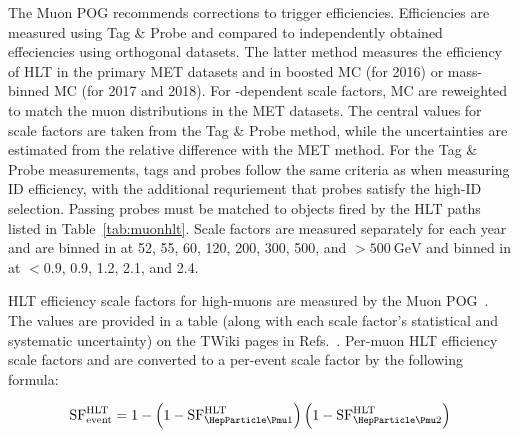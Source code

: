 The Muon POG recommends corrections to trigger efficiencies. Efficiencies are measured using Tag \& Probe and compared to independently obtained effeciencies using orthogonal datasets. The latter method measures the efficiency of HLT in the primary MET datasets and in boosted \WJETS MC (for 2016) or mass-binned \HepProcess{\PW^* \to \Pmu\Pnu} MC (for 2017 and 2018). For \pseudorap-dependent scale factors, MC are reweighted to match the muon \pt distributions in the MET datasets. The central values for scale factors are taken from the Tag \& Probe method, while the uncertainties are estimated from the relative difference with the MET method. For the Tag \& Probe measurements, tags and probes follow the same criteria as when measuring ID efficiency, with the additional requriement that probes satisfy the high-\pt ID selection. Passing probes must be matched to objects fired by the HLT paths listed in Table~\ref{tab:muonhlt}. Scale factors are measured separately for each year and are binned in \pt at 52, 55, 60, 120, 200, 300, 500, and $> \SI{500}{\GeV}$ and binned in \pseudorap at $< 0.9$, 0.9, 1.2, 2.1, and 2.4.

HLT efficiency scale factors for high-\pt muons are measured by the Muon POG~\cite{MUO-17-001}\cite{AN-18-008}. The values are provided in a table (along with each scale factor's statistical and systematic uncertainty) on the TWiki pages in Refs.~\cite{MuonTwiki2016}\cite{MuonTwiki2017}\cite{MuonTwiki2018}. Per-muon HLT efficiency scale factors  and  are converted to a per-event scale factor  by the following formula:

\begin{equation}
  \SF{HLT}{event} = 1-\left(1-\SF{HLT}{\PmuOne}\right)\left(1-\SF{HLT}{\PmuTwo}\right)
\end{equation}
